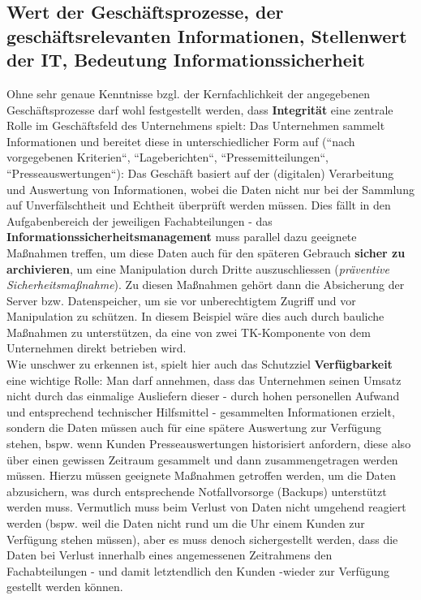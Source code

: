 \subsection*{Wert der Geschäftsprozesse, der geschäftsrelevanten Informationen, Stellenwert der IT, Bedeutung Informationssicherheit}

Ohne sehr genaue Kenntnisse bzgl. der Kernfachlichkeit der angegebenen Geschäftsprozesse darf wohl festgestellt werden, dass \textbf{Integrität} eine zentrale Rolle im Geschäftsfeld des Unternehmens spielt: Das Unternehmen sammelt Informationen und bereitet diese in unterschiedlicher Form auf (``nach vorgegebenen Kriterien``, ``Lageberichten``, ``Pressemitteilungen``, ``Presseauswertungen``):
Das Geschäft basiert auf der (digitalen) Verarbeitung und Auswertung von Informationen, wobei die Daten nicht nur bei der Sammlung auf Unverfälschtheit und Echtheit überprüft werden müssen.
Dies fällt in den Aufgabenbereich der jeweiligen Fachabteilungen - das \textbf{Informationssicherheitsmanagement} muss parallel dazu geeignete Maßnahmen treffen, um diese Daten auch für den späteren Gebrauch \textbf{sicher zu archivieren}, um eine Manipulation durch Dritte auszuschliessen (\textit{präventive Sicherheitsmaßnahme}).
Zu diesen Maßnahmen gehört dann die Absicherung der Server bzw. Datenspeicher, um sie vor unberechtigtem Zugriff und vor Manipulation zu schützen.
In diesem Beispiel wäre dies auch durch  bauliche Maßnahmen  zu unterstützen, da eine von zwei TK-Komponente von dem Unternehmen direkt betrieben wird.\\


Wie unschwer zu erkennen ist, spielt hier auch das Schutzziel \textbf{Verfügbarkeit} eine wichtige Rolle: Man darf annehmen, dass das Unternehmen seinen Umsatz nicht durch das einmalige Ausliefern dieser - durch hohen personellen Aufwand und entsprechend technischer Hilfsmittel - gesammelten Informationen erzielt, sondern die Daten müssen auch für eine spätere Auswertung zur Verfügung stehen, bspw. wenn Kunden Presseauswertungen historisiert anfordern, diese also über einen gewissen Zeitraum gesammelt und dann zusammengetragen werden müssen.
Hierzu müssen geeignete Maßnahmen getroffen werden, um die Daten abzusichern, was durch entsprechende Notfallvorsorge (Backups) unterstützt werden muss.
Vermutlich muss beim Verlust von Daten nicht umgehend reagiert werden (bspw. weil die Daten nicht rund um die Uhr einem Kunden zur Verfügung stehen müssen), aber es muss denoch sichergestellt werden, dass die Daten bei Verlust innerhalb eines angemessenen Zeitrahmens den Fachabteilungen - und damit letztendlich den Kunden -wieder zur Verfügung gestellt werden können.\\


